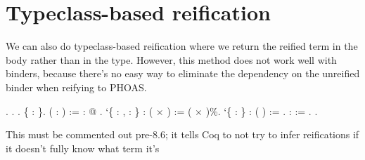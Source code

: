 \begin{coqdoccode}
\end{coqdoccode}
\section{Typeclass-based reification}

 We can also do typeclass-based reification where we return the
    reified term in the body rather than in the type.  However, this
    method does not work well with binders, because there's no easy
    way to eliminate the dependency on the unreified binder when
    reifying to PHOAS. \begin{coqdoccode}
\coqdocemptyline
\coqdocnoindent
{}  .\coqdoceol
\coqdocemptyline
\coqdocnoindent
{}        .\coqdoceol
\coqdocnoindent
{} .\coqdoceol
\coqdocindent{1.00em}
 \{ : \}.\coqdoceol
\coqdocemptyline
\coqdocindent{1.00em}
  ( : ) :=  : @ .\coqdoceol
\coqdocindent{1.00em}
  `\{ :  ,  :  \}\coqdoceol
\coqdocindent{2.00em}
:  ( \ensuremath{\times} ) := ( \ensuremath{\times} )\%.\coqdoceol
\coqdocindent{1.00em}
  `\{ :  \}\coqdoceol
\coqdocindent{2.00em}
:  ( ) :=  .\coqdoceol
\coqdocindent{1.00em}
 \coqdoceol
\coqdocindent{2.00em}
:   := .\coqdoceol
\coqdocnoindent
{} .\coqdoceol
\coqdocemptyline
\end{coqdoccode}
This must be commented out pre-8.6; it tells Coq to not try to
    infer reifications if it doesn't fully know what term it's
